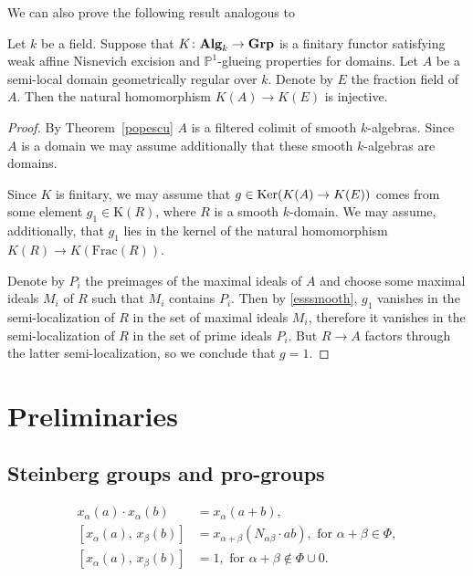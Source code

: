 \documentclass[oneside, 11pt]{amsart} \pdfoutput=1
\begin{document}
We can also prove the following result analogous to~\cite[Theorem~1.2]{Sta20}
\begin{theorem}
Let $k$ be a field.
Suppose that $K\colon{\normalfont\textbf{Alg}}_k\rightarrow{\normalfont\textbf{Grp}}$
is a finitary functor satisfying weak affine Nisnevich excision and $\mathbb{P}^1$-glueing properties for domains. 
Let $A$ be a semi-local domain geometrically regular over $k$. 
Denote by $E$ the fraction field of $A$.
Then the natural homomorphism $K(A) \to K(E)$ is injective.
\end{theorem}
\begin{proof}
By Theorem~\ref{popescu} $A$ is a filtered colimit of smooth $k$-algebras. Since $A$ is a domain we may assume additionally that these smooth $k$-algebras are domains.

Since $K$ is finitary, we may assume that $g \in \mathop{\mathrm{Ker}}\nolimits(K(A) \to K(E))$ comes from some element $g_1\in\mathrm K(R)$, where $R$ is a smooth $k$-domain. We may assume, additionally, that $g_1$ lies in the kernel of the natural homomorphism $K(R) \to K(\mathrm{Frac}(R))$.

Denote by $P_i$ the preimages of the maximal ideals of $A$ and choose some maximal ideals $M_i$ of $R$ such that $M_i$ contains $P_i$. Then by \cref{esssmooth}, $g_1$ vanishes in the semi-localization of $R$ in the set of maximal ideals $M_i$, therefore it vanishes in the semi-localization of $R$ in the set of prime ideals $P_i$.
But $R\rightarrow A$ factors through the latter semi-localization, so we conclude that $g=1$. 
\end{proof}

\section{Preliminaries}

\subsection{Steinberg groups and pro-groups}
\begin{align}
x_{\alpha}(a)\cdot x_{\alpha}(b)&=x_{\alpha}(a+b), \tag{R1} \label{Steinberg-additivity}\\
[x_{\alpha}(a),\,x_{\beta}(b)]  &=x_{\alpha+\beta}(N_{\alpha\beta} \cdot ab),\text{ for }\alpha+\beta\in\Phi, \tag{R2} \label{Chevalley-CCF1} \\
[x_{\alpha}(a),\,x_{\beta}(b)]  &=1,\text{ for }\alpha+\beta\not\in\Phi\cup0. \tag{R3} \label{Chevalley-CCF2}
\end{align}
\end{document}
